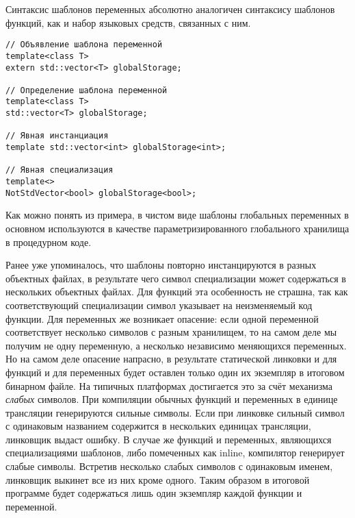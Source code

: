 Синтаксис шаблонов переменных абсолютно аналогичен синтаксису шаблонов функций, как и набор языковых средств, связанных с ним.
\begin{verbatim}
// Объявление шаблона переменной
template<class T>
extern std::vector<T> globalStorage;

// Определение шаблона переменной
template<class T>
std::vector<T> globalStorage;

// Явная инстанциация
template std::vector<int> globalStorage<int>;

// Явная специализация
template<>
NotStdVector<bool> globalStorage<bool>;
\end{verbatim}

Как можно понять из примера, в чистом виде шаблоны глобальных переменных в основном используются в качестве параметризированного глобального хранилища в процедурном коде.

Ранее уже упоминалось, что шаблоны повторно инстанцируются в разных объектных файлах, в результате чего символ специализации может содержаться в нескольких объектных файлах.
Для функций эта особенность не страшна, так как соответствующий специализации символ указывает на неизменяемый код функции.
Для переменных же возникает опасение: если одной переменной соответствует несколько символов с разным хранилищем, то на самом деле мы получим не одну переменную, а несколько независимо меняющихся переменных.
Но на самом деле опасение напрасно, в результате статической линковки и для функций и для переменных будет оставлен только один их экземпляр в итоговом бинарном файле.
На типичных платформах достигается это за счёт механизма \textit{слабых} символов.
При компиляции обычных функций и переменных в единице трансляции генерируются сильные символы.
Если при линковке сильный символ с одинаковым названием содержится в нескольких единицах трансляции, линковщик выдаст ошибку.
В случае же функций и переменных, являющихся специализациями шаблонов, либо помеченных как inline, компилятор генерирует слабые символы.
Встретив несколько слабых символов с одинаковым именем, линковщик выкинет все из них кроме одного.
Таким образом в итоговой программе будет содержаться лишь один экземпляр каждой функции и переменной.

